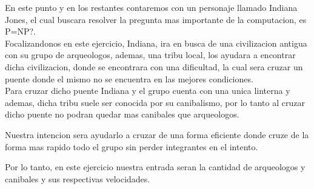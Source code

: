 En este punto y en los restantes contaremos con un personaje llamado Indiana Jones, el cual buscara resolver la pregunta mas importante de la computacion, es P=NP?.\\

Focalizandonos en este ejercicio, Indiana, ira en busca de una civilizacion antigua con su grupo de arqueologos, ademas, una tribu local, los ayudara a encontrar dicha civilizacion, donde se encontrara con una dificultad, la cual sera cruzar un puente donde el mismo no se encuentra en las mejores condiciones.\\

Para cruzar dicho puente Indiana y el grupo cuenta con una unica linterna y ademas, dicha tribu suele ser conocida por su canibalismo, por lo tanto al cruzar dicho puente no podran quedar mas canibales que arqueologos.

Nuestra intencion sera ayudarlo a cruzar de una forma eficiente donde cruze de la forma mas rapido todo el grupo sin perder integrantes en el intento.

Por lo tanto, en este ejercicio nuestra entrada seran la cantidad de arqueologos y canibales y sus respectivas velocidades.

